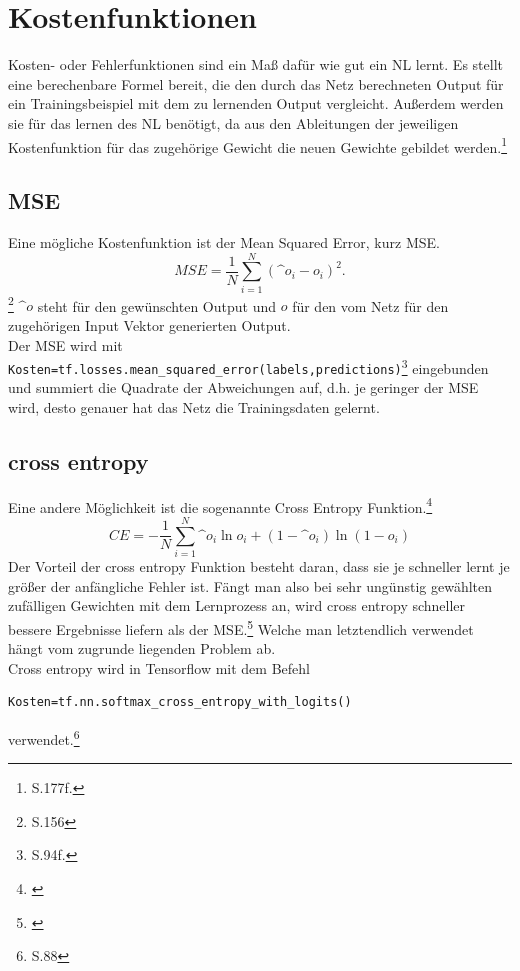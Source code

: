 \section{Kostenfunktionen}
Kosten- oder Fehlerfunktionen sind ein Maß dafür wie gut ein \gls{NL} lernt. Es stellt eine berechenbare Formel bereit, die den durch das Netz berechneten Output für ein Trainingsbeispiel mit dem zu lernenden Output vergleicht. Außerdem werden sie für das lernen des \gls{NL} benötigt, da aus den Ableitungen der jeweiligen Kostenfunktion für das zugehörige Gewicht die neuen Gewichte gebildet werden.\footnote{\cite{Goodfellow}S.177f.}
\subsection{MSE}
Eine mögliche Kostenfunktion ist der Mean Squared Error, kurz MSE.
\begin{equation}
MSE=\frac{1}{N}\sum_{i=1}^{N} (\^{o}_i-o_i)^2.
\end{equation}\footnote{\cite{Rojas1996}S.156}
$\^{o}$ steht für den gewünschten Output und $o$ für den vom Netz für den zugehörigen Input Vektor generierten Output.\\
Der MSE wird mit  \lstinline$Kosten=tf.losses.mean_squared_error(labels,predictions)$\footnote{\cite{cookbook}S.94f.} eingebunden und summiert die Quadrate der Abweichungen auf, d.h. je geringer der MSE wird, desto genauer hat das Netz die Trainingsdaten gelernt.
\subsection{cross entropy}
Eine andere Möglichkeit ist die sogenannte Cross Entropy Funktion.\footnote{\cite{Nielsen}}
\begin{equation}
CE= - \frac{1}{N} \sum_{i=1}^{N}\^{o}_i \ln o_i + (1- \^{o}_i) \ln (1-o_i)
\end{equation}
Der Vorteil der cross entropy Funktion besteht daran, dass sie je schneller lernt je größer der anfängliche Fehler ist. Fängt man also bei sehr ungünstig gewählten zufälligen Gewichten mit dem Lernprozess an, wird cross entropy schneller bessere Ergebnisse liefern als der MSE.\footnote{\cite{Nielsen}} Welche man letztendlich verwendet hängt vom zugrunde liegenden Problem ab.\\
Cross entropy wird in Tensorflow mit dem Befehl 
\begin{lstlisting}
Kosten=tf.nn.softmax_cross_entropy_with_logits()
\end{lstlisting}verwendet.\footnote{\cite{cookbook}S.88}
